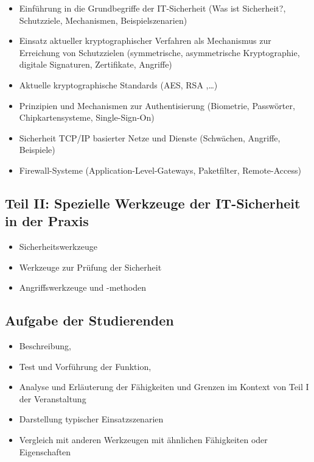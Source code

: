 \begin{itemize}
\item
  Einführung in die Grundbegriffe der IT-Sicherheit (Was ist
  Sicherheit?, Schutzziele, Mechanismen, Beispielszenarien)
\item
  Einsatz aktueller kryptographischer Verfahren als Mechanismus zur
  Erreichung von Schutzzielen (symmetrische, asymmetrische
  Kryptographie, digitale Signaturen, Zertifikate, Angriffe)
\item
  Aktuelle kryptographische Standards (AES, RSA ,\ldots{})
\item
  Prinzipien und Mechanismen zur Authentisierung (Biometrie, Passwörter,
  Chipkartensysteme, Single-Sign-On)
\item
  Sicherheit TCP/IP basierter Netze und Dienste (Schwächen, Angriffe,
  Beispiele)
\item
  Firewall-Systeme (Application-Level-Gateways, Paketfilter,
  Remote-Access)
\end{itemize}

\subsection*{Teil II: Spezielle Werkzeuge der IT-Sicherheit in der
Praxis}\label{teil-ii-spezielle-werkzeuge-der-it-sicherheit-in-der-praxis}

\begin{itemize}
\item
  Sicherheitswerkzeuge
\item
  Werkzeuge zur Prüfung der Sicherheit
\item
  Angriffswerkzeuge und -methoden
\end{itemize}

\subsection*{Aufgabe der Studierenden}\label{aufgabe-der-studierenden}

\begin{itemize}
\item
  Beschreibung,
\item
  Test und Vorführung der Funktion,
\item
  Analyse und Erläuterung der Fähigkeiten und Grenzen im Kontext von
  Teil I der Veranstaltung
\item
  Darstellung typischer Einsatzszenarien
\item
  Vergleich mit anderen Werkzeugen mit ähnlichen Fähigkeiten oder
  Eigenschaften
\end{itemize}

